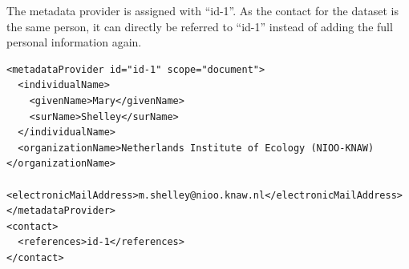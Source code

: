\documentclass[
  oneside]{book}
\begin{document}
\begin{examplebox}

The metadata provider is assigned with ``id-1''. As the contact for the dataset is the same person, it can directly be referred to ``id-1'' instead of adding the full personal information again.

\begin{verbatim}
<metadataProvider id="id-1" scope="document">
  <individualName>
    <givenName>Mary</givenName>
    <surName>Shelley</surName>
  </individualName>
  <organizationName>Netherlands Institute of Ecology (NIOO-KNAW)</organizationName>
  <electronicMailAddress>m.shelley@nioo.knaw.nl</electronicMailAddress>
</metadataProvider>
<contact>
  <references>id-1</references>
</contact>
\end{verbatim}

\end{examplebox}
\end{document}
